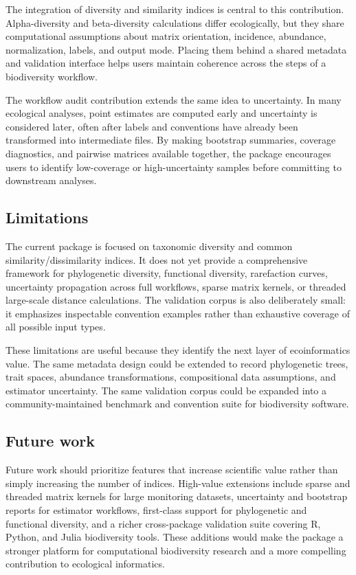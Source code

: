 \documentclass[preprint,12pt,authoryear]{elsarticle}
\begin{document}
The integration of diversity and similarity indices is central to this
contribution.  Alpha-diversity and beta-diversity calculations differ
ecologically, but they share computational assumptions about matrix
orientation, incidence, abundance, normalization, labels, and output mode.
Placing them behind a shared metadata and validation interface helps users
maintain coherence across the steps of a biodiversity workflow.

The workflow audit contribution extends the same idea to uncertainty.  In
many ecological analyses, point estimates are computed early and uncertainty
is considered later, often after labels and conventions have already been
transformed into intermediate files.  By making bootstrap summaries, coverage
diagnostics, and pairwise matrices available together, the package encourages
users to identify low-coverage or high-uncertainty samples before committing
to downstream analyses.

\subsection{Limitations}

The current package is focused on taxonomic diversity and common
similarity/dissimilarity indices.  It does not yet provide a comprehensive
framework for phylogenetic diversity, functional diversity, rarefaction
curves, uncertainty propagation across full workflows, sparse matrix kernels,
or threaded large-scale distance calculations.  The validation corpus is also
deliberately small: it emphasizes inspectable convention examples rather than
exhaustive coverage of all possible input types.

These limitations are useful because they identify the next layer of
ecoinformatics value.  The same metadata design could be extended to record
phylogenetic trees, trait spaces, abundance transformations, compositional
data assumptions, and estimator uncertainty.  The same validation corpus
could be expanded into a community-maintained benchmark and convention suite
for biodiversity software.

\subsection{Future work}

Future work should prioritize features that increase scientific value rather
than simply increasing the number of indices.  High-value extensions include
sparse and threaded matrix kernels for large monitoring datasets, uncertainty
and bootstrap reports for estimator workflows, first-class support for
phylogenetic and functional diversity, and a richer cross-package validation
suite covering R, Python, and Julia biodiversity tools.  These additions would
make the package a stronger platform for computational biodiversity research
and a more compelling contribution to ecological informatics.
\end{document}
